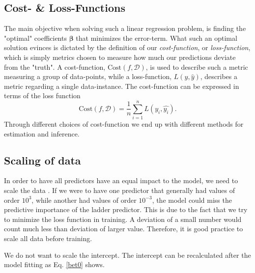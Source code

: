 
\subsection{Cost- \& Loss-Functions}
The main objective when solving such a linear regression problem, is finding the "optimal" coefficients $\boldsymbol{\beta}$ that minimizes the error-term. 
What such an optimal solution evinces is dictated by the definition of our \textit{cost-function},  or \textit{loss-function}, which is simply metrics chosen to measure how much our predictions deviate from the "truth". 
A cost-function, $\text{Cost}(f,\mathcal{D} )$, is used to describe such a metric measuring a group of data-points, while a loss-function, $L(y, \hat{y})$, describes a metric regarding a single data-instance. 
The cost-function can be expressed in terms of the loss function
\begin{equation}
\text{Cost}(f,\mathcal{D}) = \frac{1}{n}\sum_{i=1}^n L(y_i, \hat{y_i}).
\end{equation}
Through different choices of cost-function we end up with different methods for estimation and inference. 





\subsection{Scaling of data}

In order to have all predictors have an equal impact to the model, we need to scale the data \citep[p. 398]{hastie}. If we were to have one predictor that generally had values of order $10^3$, while another had values of order $10^{-3}$, the model could miss the predictive importance of the ladder predictor. This is due to the fact that we try to minimize the loss function in training. A deviation of a small number would count much less than deviation of larger value. Therefore, it is good practice to scale all data before training. 

We do not want to scale the intercept.  The intercept can be recalculated after the model fitting as Eq. \ref{bet0} shows.



